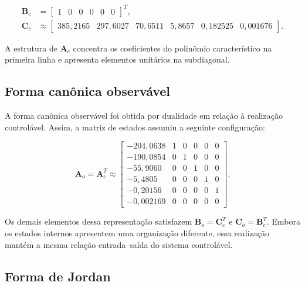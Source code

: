 \documentclass[10pt,a4paper]{article}
\newcommand{\mat}[1]{\mathbf{#1}}
\begin{document}
\begingroup
\small
\setlength{\arraycolsep}{3pt}
\begin{equation}
\begin{aligned}
\mat{B}_{c} &=
\begin{bmatrix}
1 & 0 & 0 & 0 & 0 & 0
\end{bmatrix}^{T},\\[6pt]
\mat{C}_{c} &\approx
\begin{bmatrix}
385{,}2165 & 297{,}6027 & 70{,}6511 &
5{,}8657 & 0{,}182525 & 0{,}001676
\end{bmatrix}.
\end{aligned}
\end{equation}
\endgroup

A estrutura de $\mat{A}_{c}$ concentra os coeficientes do polinômio característico na primeira linha e apresenta elementos unitários na subdiagonal.

\subsection{Forma canônica observável}

A forma canônica observável foi obtida por dualidade em relação à realização controlável. Assim, a matriz de estados assumiu a seguinte configuração:

\begingroup
\small
\setlength{\arraycolsep}{3pt}
\begin{equation}
\mat{A}_{o}=\mat{A}_{c}^{T}\approx
\begin{bmatrix}
-204{,}0638 & 1 & 0 & 0 & 0 & 0\\
-190{,}0854 & 0 & 1 & 0 & 0 & 0\\
-55{,}9060 & 0 & 0 & 1 & 0 & 0\\
-5{,}4805 & 0 & 0 & 0 & 1 & 0\\
-0{,}20156 & 0 & 0 & 0 & 0 & 1\\
-0{,}002169 & 0 & 0 & 0 & 0 & 0
\end{bmatrix}.
\label{eq:Ao}
\end{equation}
\endgroup

Os demais elementos dessa representação satisfazem $\mat{B}_{o}=\mat{C}_{c}^{T}$ e $\mat{C}_{o}=\mat{B}_{c}^{T}$. Embora os estados internos apresentem uma organização diferente, essa realização mantém a mesma relação entrada--saída do sistema controlável.

\subsection{Forma de Jordan}
\end{document}
